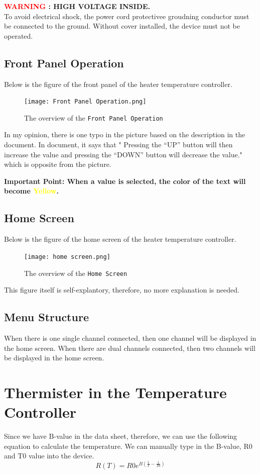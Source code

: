 \documentclass{article}
\begin{document}
\textbf{\textcolor{red}{WARNING} : HIGH VOLTAGE INSIDE.} \\
To avoid electrical shock, the power cord protectivee groudning conductor must be connected to the ground.
Without cover installed, the device must not be operated. 

\subsection{Front Panel Operation}
Below is the figure of the front panel of the heater temperature controller.
\begin{figure}[htpb]
    \centering
    \texttt{[image: Front Panel Operation.png]}
    \caption{The overview of the \texttt{Front Panel Operation}}
    \label{fig:s_r}
\end{figure}

In my opinion, there is one typo in the picture based on the description in the document.
In document, it says that " Pressing the “UP” button will then increase the value and pressing the “DOWN” button will decrease the value."
which is opposite from the picture. 

\textbf{Important Point: When a value is selected, the color of the text will become \textcolor{yellow}{Yellow}.}
\subsection{Home Screen}
Below is the figure of the home screen of the heater temperature controller.
\begin{figure}[htpb]
    \centering
    \texttt{[image: home screen.png]}
    \caption{The overview of the \texttt{Home Screen}}
    \label{fig:s_r}
\end{figure}
This figure itself is self-explantory, therefore, no more explanation is needed.
\subsection{Menu Structure}
When there is one single channel connected, then one channel will be displayed in the home screen. 
When there are dual channels connected, then two channels will be displayed in the home screen. 

\section{Thermister in the Temperature Controller}
Since we have B-value in the data sheet, therefore, we can use the following equation to calculate the temperature. 
We can manually type in the B-value, R0 and T0 value into the device.
\begin{equation}
    R(T) = R0e^{B(\frac{1}{T} - \frac{1}{T0})} 
\end{equation}
\end{document}
